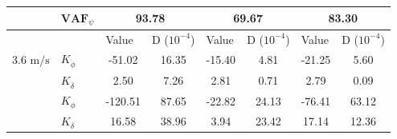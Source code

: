 \begin{table}[]
\begin{tabular}{llcccccc}
                                 & $\mathbf{VAF}_\psi$   & \multicolumn{2}{c}{93.78}                                                                       & \multicolumn{2}{c}{69.67}                                                                       & \multicolumn{2}{c}{83.30}                                                                       \\ \hline
                                 &                       & \multicolumn{1}{l}{\multirow{2}{*}{Value}} & \multicolumn{1}{l}{\multirow{2}{*}{D ($10^{-4}$)}} & \multicolumn{1}{l}{\multirow{2}{*}{Value}} & \multicolumn{1}{l}{\multirow{2}{*}{D ($10^{-4}$)}} & \multicolumn{1}{l}{\multirow{2}{*}{Value}} & \multicolumn{1}{l}{\multirow{2}{*}{D ($10^{-4}$)}} \\
                                 &                       & \multicolumn{1}{l}{}                       & \multicolumn{1}{l}{}                               & \multicolumn{1}{l}{}                       & \multicolumn{1}{l}{}                               & \multicolumn{1}{l}{}                       & \multicolumn{1}{l}{}                               \\ \cline{3-8} 
    3.6 $\si{\meter\per\second}$ & $K_{\dot{\phi}} $     & -51.02                                     & 16.35                                              & -15.40                                     & 4.81                                               & -21.25                                     & 5.60                                               \\
                                 & $K_{\dot{\delta}}$    & 2.50                                       & 7.26                                               & 2.81                                       & 0.71                                               & 2.79                                       & 0.09                                               \\
                                 & $K_{\phi} $           & -120.51                                    & 87.65                                              & -22.82                                     & 24.13                                              & -76.41                                     & 63.12                                              \\
                                 & $K_\delta $           & 16.58                                      & 38.96                                              & 3.94                                       & 23.42                                              & 17.14                                      & 12.36                                              \\

\end{tabular}
\end{table}
